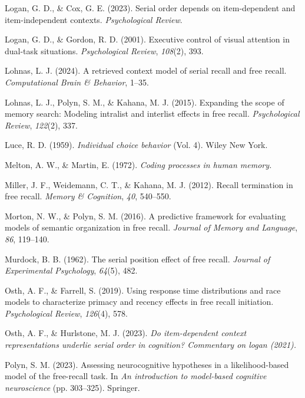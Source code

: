 \documentclass[
  man,
  floatsintext,
  longtable,
  nolmodern,
  notxfonts,
  notimes,
  draftfirst,
  colorlinks=true,linkcolor=blue,citecolor=blue,urlcolor=blue]{apa7}
\newlength{\cslhangindent}
\newenvironment{CSLReferences}[2] %
 {\begin{list}{}{%
  \setlength{\itemindent}{0pt}
  \setlength{\leftmargin}{0pt}
  \setlength{\parsep}{0pt}
  \ifodd #1
   \setlength{\leftmargin}{\cslhangindent}
   \setlength{\itemindent}{-1\cslhangindent}
  \fi
  \setlength{\itemsep}{#2\baselineskip}}}
 {\end{list}}
\begin{document}
\begin{CSLReferences}{1}{0}
Logan, G. D., \& Cox, G. E. (2023). Serial order depends on
item-dependent and item-independent contexts. \emph{Psychological
Review}.

Logan, G. D., \& Gordon, R. D. (2001). Executive control of visual
attention in dual-task situations. \emph{Psychological Review},
\emph{108}(2), 393.

Lohnas, L. J. (2024). A retrieved context model of serial recall and
free recall. \emph{Computational Brain \& Behavior}, 1--35.

Lohnas, L. J., Polyn, S. M., \& Kahana, M. J. (2015). Expanding the
scope of memory search: Modeling intralist and interlist effects in free
recall. \emph{Psychological Review}, \emph{122}(2), 337.

Luce, R. D. (1959). \emph{Individual choice behavior} (Vol. 4). Wiley
New York.

Melton, A. W., \& Martin, E. (1972). \emph{Coding processes in human
memory.}

Miller, J. F., Weidemann, C. T., \& Kahana, M. J. (2012). Recall
termination in free recall. \emph{Memory \& Cognition}, \emph{40},
540--550.

Morton, N. W., \& Polyn, S. M. (2016). A predictive framework for
evaluating models of semantic organization in free recall. \emph{Journal
of Memory and Language}, \emph{86}, 119--140.

Murdock, B. B. (1962). The serial position effect of free recall.
\emph{Journal of Experimental Psychology}, \emph{64}(5), 482.

Osth, A. F., \& Farrell, S. (2019). Using response time distributions
and race models to characterize primacy and recency effects in free
recall initiation. \emph{Psychological Review}, \emph{126}(4), 578.

Osth, A. F., \& Hurlstone, M. J. (2023). \emph{Do item-dependent context
representations underlie serial order in cognition? Commentary on logan
(2021).}

Polyn, S. M. (2023). Assessing neurocognitive hypotheses in a
likelihood-based model of the free-recall task. In \emph{An introduction
to model-based cognitive neuroscience} (pp. 303--325). Springer.


\end{CSLReferences}
\end{document}

